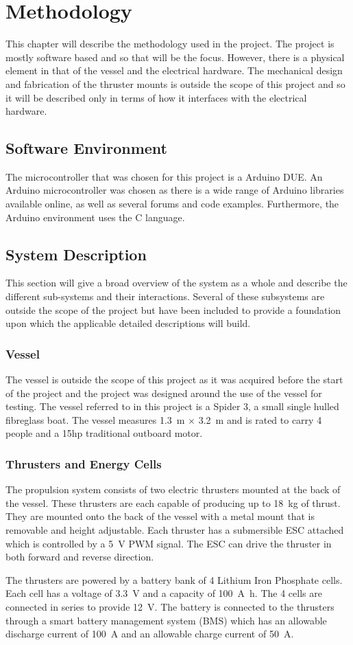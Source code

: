 \chapter{Methodology}
This chapter will describe the methodology used in the project. The project is mostly software based and so that will be the focus. However, there is a physical element in that of the vessel and the electrical hardware. The mechanical design and fabrication of the thruster mounts is outside the scope of this project and so it will be described only in terms of how it interfaces with the electrical hardware.
\section{Software Environment}
The microcontroller that was chosen for this project is a Arduino DUE. An Arduino microcontroller was chosen as there is a wide range of Arduino libraries available online, as well as several forums and code examples. Furthermore, the Arduino environment uses the C language. 
\section{System Description}
This section will give a broad overview of the system as a whole and describe the different sub-systems and their interactions. Several of these subsystems are outside the scope of the project but have been included to provide a foundation upon which the applicable detailed descriptions will build.
\subsection{Vessel}
The vessel is outside the scope of this project as it was acquired before the start of the project and the project was designed around the use of the vessel for testing. The vessel referred to in this project is a Spider 3, a small single hulled fibreglass boat. The vessel measures \SI{1.3}{\meter} $\times$ \SI{3.2}{\meter} and is rated to carry 4 people and a 15hp traditional outboard motor.
\subsection{Thrusters and Energy Cells}
The propulsion system consists of two electric thrusters mounted at the back of the vessel. These thrusters are each capable of producing up to \SI{18}{\kilogram} of thrust. They are mounted onto the back of the vessel with a metal mount that is removable and height adjustable. Each thruster has a submersible ESC attached which is controlled by a \SI{5}{\volt} PWM signal. The ESC can drive the thruster in both forward and reverse direction.\par
\vspace{0.4cm}
The thrusters are powered by a battery bank of 4 Lithium Iron Phosphate cells. Each cell has a voltage of \SI{3.3}{\volt} and a capacity of \SI{100}{\ampere\hour}. The 4 cells are connected in series to provide \SI{12}{\volt}. The battery is connected to the thrusters through a smart battery management system (BMS) which has an allowable discharge current of \SI{100}{\ampere} and an allowable charge current of \SI{50}{\ampere}.
